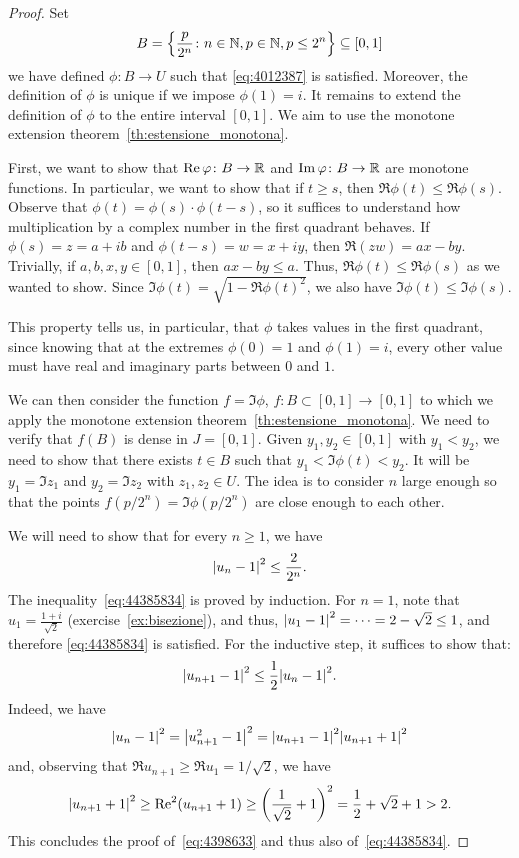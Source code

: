 \begin{proof}
Set 
\[
B = {\left\{ \frac{p}{2^n}\colon n\in {\mathbb N}, p\in {\mathbb N}, p\le 2^n \right\}} \subseteq [0,1]
\]
we have defined $\phi\colon B\to U$ such that \eqref{eq:4012387}
is satisfied. 
Moreover, the definition of $\phi$ is unique if we impose  
$\phi(1)=i$.
It remains to extend the definition of $\phi$ to the entire 
interval $[0,1]$. 
We aim to use the monotone extension theorem~\ref{th:estensione_monotona}.

First, we want to show that $\operatorname{Re} \varphi\colon B\to {\mathbb R}$ 
and $\operatorname{Im} \varphi\colon B\to {\mathbb R}$ are monotone functions.
In particular, we want to show that if $t\ge s$, then 
$\Re \phi(t) \le \Re \phi(s)$.
Observe that $\phi(t) = \phi(s)\cdot \phi(t-s)$, 
so it suffices to understand how multiplication by a 
complex number in the first quadrant behaves.
If $\phi(s)=z=a+ib$ and $\phi(t-s)=w=x+iy$, then
$\Re (zw) = ax-by$. 
Trivially, if $a,b,x,y\in[0,1]$, then $ax-by \le a$. 
Thus, $\Re \phi(t)\le \Re \phi(s)$ as we wanted to show.
Since $\Im \phi(t) = \sqrt{1-\Re \phi(t)^2}$, we also have
$\Im \phi(t) \le \Im \phi(s)$.

This property tells us, in particular, that $\phi$ takes values 
in the first quadrant, since knowing that at the extremes 
$\phi(0) = 1$ 
and $\phi(1)=i$, every other value must have real 
and imaginary parts between $0$ and $1$.

We can then consider the function 
$f=\Im \phi$, $f\colon B\subset [0,1]\to[0,1]$
to which we apply the monotone extension theorem~\ref{th:estensione_monotona}.
We need to verify that $f(B)$ is dense in $J=[0,1]$. 
Given $y_1,y_2\in [0,1]$ with $y_1<y_2$, we need to show that there exists $t\in
B$ such
that $y_1 < \Im \phi(t) < y_2$.
It will be $y_1=\Im z_1$ and $y_2=\Im z_2$ with $z_1,z_2\in U$.
The idea is to consider $n$ large enough so that the points $f(p/2^n)= \Im
\phi(p/2^n)$ are close enough to each other.

We will need to show that for every $n\ge 1$, we have
\begin{equation}
  \label{eq:44385834}
  {\left|u_n-1\right|}^2 \le \frac{2}{2^n}.
\end{equation}
The inequality~\eqref{eq:44385834} is proved by induction.
For $n=1$, note that 
$u_1=\frac{1+i}{\sqrt 2}$ (exercise~\ref{ex:bisezione}), and thus,
${\left|u_1-1\right|}^2 = \dots = 2-\sqrt 2 \le 1$, and therefore 
\eqref{eq:44385834} is satisfied.
For the inductive step, it suffices to show that:
\begin{equation}
  \label{eq:4398633}
   {\left|u_{n+1}-1\right|}^2 \le \frac 1 2 {\left|u_n-1\right|}^2.
\end{equation}
Indeed, we have
\[
  {\left|u_n-1\right|}^2
  = {\left|u_{n+1}^2-1\right|}^2
  = {\left|u_{n+1}-1\right|}^2 {\left|u_{n+1}+1\right|}^2
\]
and, observing that $\Re u_{n+1}\ge \Re u_1 = 1/\sqrt 2$, we have
\[
 {\left|u_{n+1}+1\right|}^2 \ge \operatorname{Re}^2(u_{n+1}+1) 
 \ge {\left( \frac{1}{\sqrt 2}+1 \right)}^2 = \frac 1 2 + \sqrt 2 + 1 > 2.
\]
This concludes the proof of~\eqref{eq:4398633} and 
thus also of~\eqref{eq:44385834}.


\end{proof}
